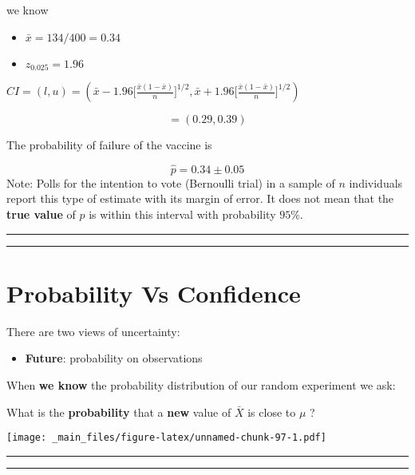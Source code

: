 \documentclass[
]{book}
\providecommand{\tightlist}{%
  \setlength{\itemsep}{0pt}\setlength{\parskip}{0pt}}
\begin{document}
we know

\begin{itemize}
\tightlist
\item
  \(\bar{x}=134/400=0.34\)
\item
  \(z_{0.025}=1.96\)
\end{itemize}

\(CI=(l,u)=(\bar{x}-1.96 \big[\frac{\bar{x}(1-\bar{x})}{n} \big]^{1/2}, \bar{x}+1.96 \big[\frac{\bar{x}(1-\bar{x})}{n} \big]^{1/2})\)

\[=(0.29,0.39)\]

The probability of failure of the vaccine is

\[\hat{p}=0.34 \pm 0.05\]
Note: Polls for the intention to vote (Bernoulli trial) in a sample of \(n\) individuals report this type of estimate with its margin of error. It does not mean that the \textbf{true value} of \(p\) is within this interval with probability \(95\%\).

\begin{center}\rule{0.5\linewidth}{0.5pt}\end{center}

\begin{center}\rule{0.5\linewidth}{0.5pt}\end{center}

\hypertarget{probability-vs-confidence}{%
\section{Probability Vs Confidence}\label{probability-vs-confidence}}

There are two views of uncertainty:

\begin{itemize}
\tightlist
\item
  \textbf{Future}: probability on observations
\end{itemize}

When \textbf{we know} the probability distribution of our random experiment we ask:

What is the \textbf{probability} that a \textbf{new} value of \(\bar{X}\) is close to \(\mu\) ?

\texttt{[image: \_main\_files/figure-latex/unnamed-chunk-97-1.pdf]}

\begin{center}\rule{0.5\linewidth}{0.5pt}\end{center}

\begin{center}\rule{0.5\linewidth}{0.5pt}\end{center}
\end{document}
